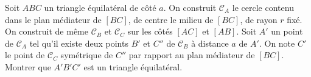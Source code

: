 Soit $ABC$ un triangle équilatéral de côté $a$. On construit $\mathcal{C}_A$ le cercle contenu dans le plan médiateur de $[BC]$, de centre le milieu de $[BC]$, de rayon $r$ fixé. On construit de même $\mathcal{C}_B$ et $\mathcal{C}_C$ sur les côtés $[AC]$ et $[AB]$. Soit $A'$ un point de $\mathcal{C}_A$ tel qu'il existe deux points $B'$ et $C''$ de $\mathcal{C}_B$ à distance $a$ de $A'$. On note $C'$ le point de $\mathcal{C}_C$ symétrique de $C''$ par rapport au plan médiateur de $[BC]$. Montrer que $A'B'C'$ est un triangle équilatéral.
